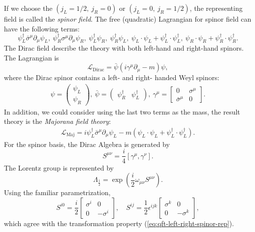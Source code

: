 \documentclass[aps,prb,superscriptaddress,nofootinbib]{revtex4}
\begin{document}
If we choose the $(j_L=1/2,\ j_R=0)$ or $(j_L=0,\ j_R=1/2)$, the representing field is called the \textit{spinor field}.
The free (quadratic) Lagrangian for spinor field can have the following terms:
\begin{equation}
	\psi_L^\dagger \bar\sigma^\mu \partial_\mu \psi_L,\ 
	\psi_R^\dagger \sigma^\mu \partial_\mu \psi_R,\ 
	\psi_L^\dagger \psi_R,\ \psi_R^\dagger \psi_L,\ 
	\psi_L \cdot \psi_L + \psi_L^\dagger \cdot \psi_L^\dagger,\ 
	\psi_R \cdot \psi_R + \psi_R^\dagger \cdot \psi_R^\dagger.
\end{equation}
The Dirac field describe the theory with both left-hand and right-hand spinors.
The Lagrangian is
\begin{equation}
	\mathcal{L}_{\mathrm{Dirac}}
	= \bar\psi \left(i\gamma^\mu \partial_\mu - m\right)\psi,
\end{equation}
where the Dirac spinor contains a left- and right- handed Weyl spinors:
\begin{eqnarray}
	\psi = \begin{pmatrix}
		\psi_L \\ \psi_R
	\end{pmatrix},\ 
	\bar\psi = \begin{pmatrix}
		\psi_R^\dagger & \psi_L^\dagger
	\end{pmatrix},\ 
	\gamma^\mu = \begin{bmatrix}
		0 & \sigma^\mu \\
		\bar\sigma^\mu & 0
	\end{bmatrix}.
\end{eqnarray}
In addition, we could consider using the last two terms as the mass, the result theory is the \textit{Majorana field theory}:
\begin{equation}
\begin{aligned}
	\mathcal{L}_{\mathrm{Maj}}
	= i \psi_L^\dagger \bar\sigma^\mu \partial_\mu  \psi_L -m(\psi_L \cdot \psi_L + \psi_L^\dagger \cdot \psi_L^\dagger).
\end{aligned}
\end{equation} 
For the spinor basis, the Dirac Algebra is generated by
\begin{equation}\label{eq:qft-diract-generator}
	S^{\mu\nu} = \frac{i}{4}[\gamma^\mu, \gamma^\nu].
\end{equation}
The Lorentz group is represented by
\begin{equation}\label{eq:qft-dirac-rep}
	\Lambda_{\frac{1}{2}} = \exp\left(\frac{i}{2}\omega_{\mu\nu} S^{\mu\nu}\right).
\end{equation}
Using the familiar parametrization,
\begin{equation}
	S^{i0} = \frac{i}{2}\left[\begin{array}{cc}
		\sigma^i & 0 \\ 0 & -\sigma^i
	\end{array}\right], \quad 
	S^{ij} = \frac{1}{2}\epsilon^{ijk} \left[\begin{array}{cc}
		\sigma^k & 0 \\ 0 & -\sigma^k
	\end{array}\right],
\end{equation}
which agree with the transformation property (\ref{eq:qft-left-right-spinor-rep}).
\end{document}
